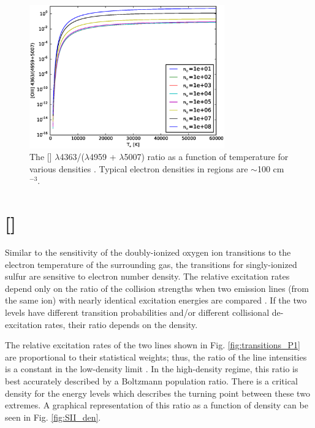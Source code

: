 \begin{figure}
    \includegraphics[width=0.75\textwidth]{Images/Appendix/[OIII]}
    \caption[{[] ratio as a function of temperature}]{The [] 
    $\lambda$4363/($\lambda$4959 + $\lambda$5007) ratio as a function of 
    temperature for various densities \citep{Luridiana15}.  Typical electron 
    densities in  regions are $\sim$100 cm$^{-3}$.}
    \label{fig:OIII_temp}
\end{figure}


\section{[]}

Similar to the sensitivity of the doubly-ionized oxygen ion transitions to the 
electron temperature of the surrounding gas, the transitions for singly-ionized 
sulfur are sensitive to electron number density.  The relative excitation rates 
depend only on the ratio of the collision strengths when two emission lines 
(from the same ion) with nearly identical excitation energies are compared 
\citep{Osterbrock89}.  If the two levels have different transition probabilities 
and/or different collisional de-excitation rates, their ratio depends on the 
density.

The relative excitation rates of the two lines shown in Fig. 
\ref{fig:transitions_P1} are proportional to their statistical weights; thus, the 
ratio of the line intensities is a constant in the low-density limit 
\citep{Osterbrock89}.  In the high-density regime, this ratio is best accurately 
described by a Boltzmann population ratio.  There is a critical density for the 
energy levels which describes the turning point between these two extremes.  A 
graphical representation of this ratio as a function of density can be seen in 
Fig. \ref{fig:SII_den}.

